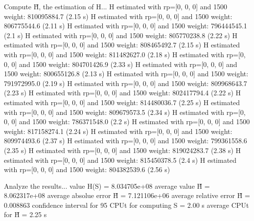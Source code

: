 Compute H̃, the estimation of H...
  H estimated with rp=[0, 0, 0] and 1500 weight:  810095884.7  (2.15 s)
  H estimated with rp=[0, 0, 0] and 1500 weight:  806775544.6  (2.11 s)
  H estimated with rp=[0, 0, 0] and 1500 weight:  796444545.1  (2.1 s)
  H estimated with rp=[0, 0, 0] and 1500 weight:  805770238.8  (2.22 s)
  H estimated with rp=[0, 0, 0] and 1500 weight:  808465492.7  (2.15 s)
  H estimated with rp=[0, 0, 0] and 1500 weight:  811482627.0  (2.18 s)
  H estimated with rp=[0, 0, 0] and 1500 weight:  804701426.9  (2.33 s)
  H estimated with rp=[0, 0, 0] and 1500 weight:  800655126.8  (2.13 s)
  H estimated with rp=[0, 0, 0] and 1500 weight:  791972995.0  (2.19 s)
  H estimated with rp=[0, 0, 0] and 1500 weight:  809968643.7  (2.23 s)
  H estimated with rp=[0, 0, 0] and 1500 weight:  802417794.4  (2.22 s)
  H estimated with rp=[0, 0, 0] and 1500 weight:  814480036.7  (2.25 s)
  H estimated with rp=[0, 0, 0] and 1500 weight:  809679573.5  (2.34 s)
  H estimated with rp=[0, 0, 0] and 1500 weight:  786371548.0  (2.2 s)
  H estimated with rp=[0, 0, 0] and 1500 weight:  817158274.1  (2.24 s)
  H estimated with rp=[0, 0, 0] and 1500 weight:  809974493.6  (2.37 s)
  H estimated with rp=[0, 0, 0] and 1500 weight:  799361558.6  (2.35 s)
  H estimated with rp=[0, 0, 0] and 1500 weight:  819024283.7  (2.38 s)
  H estimated with rp=[0, 0, 0] and 1500 weight:  815450378.5  (2.4 s)
  H estimated with rp=[0, 0, 0] and 1500 weight:  804382539.6  (2.56 s)

Analyze the results...
  value H(S)                  = 8.034705e+08 
  average value H̃             = 8.062317e+08 
  average absolue error H̃     = 7.121106e+06 
  average relative error H̃    = 0.008863 
  confidence interval for 95%
  CPUt for computing S         = 2.00 s
  average CPUt for H̃           = 2.25 s

